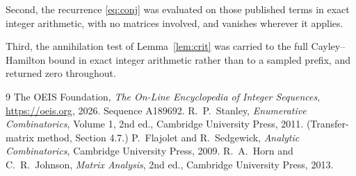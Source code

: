 \documentclass[11pt,a4paper]{article}
\theoremstyle{plain}
\theoremstyle{definition}
\begin{document}
Second, the recurrence \eqref{eq:conj} was evaluated on those published terms in exact
integer arithmetic, with no matrices involved, and vanishes wherever it applies.

Third, the annihilation test of Lemma~\ref{lem:crit} was carried to the full
Cayley--Hamilton bound in exact integer arithmetic rather than to a sampled prefix, and
returned zero throughout.

\begin{thebibliography}{9}
 The OEIS Foundation, \emph{The On-Line Encyclopedia of Integer
Sequences}, \url{https://oeis.org}, 2026. Sequence A189692.
 R.~P.~Stanley, \emph{Enumerative Combinatorics}, Volume 1, 2nd ed.,
Cambridge University Press, 2011. (Transfer-matrix method, Section 4.7.)
 P.~Flajolet and R.~Sedgewick, \emph{Analytic Combinatorics}, Cambridge
University Press, 2009.
 R.~A.~Horn and C.~R.~Johnson, \emph{Matrix Analysis}, 2nd ed., Cambridge
University Press, 2013.
\end{thebibliography}
\end{document}
